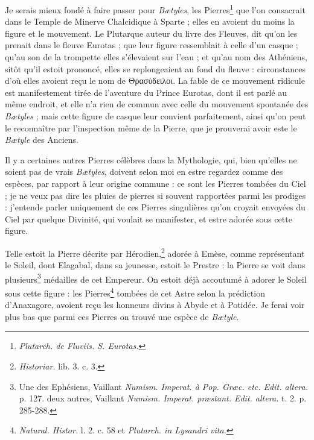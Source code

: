 \documentclass[a4paper, 11pt, oneside, polutonikogreek, french, landscape]{article}
\begin{document}
Je serais mieux fondé à faire passer pour \emph{Bætyles}, les Pierres\footnote{\emph{Plutarch. de Fluviis. S. Eurotas.}} que l'on consacrait dans le Temple de Minerve Chalcidique à Sparte ; elles en avoient du moins la figure et le mouvement. Le Plutarque auteur du livre des Fleuves, dit qu'on les prenait dans le fleuve Eurotas ; que leur figure ressemblait à celle d'un casque ; qu'au son de la trompette elles s'élevaient sur l'eau ; et qu'au nom des Athéniens, sitôt qu'il estoit prononcé, elles se replongeaient au fond du fleuve : circonstances d'où elles avoient reçu le nom de Θρασύδειλοι. La fable de ce mouvement ridicule est manifestement tirée de l'aventure du Prince Eurotas, dont il est parlé au même endroit, et elle n'a rien de commun avec celle du mouvement spontanée des \emph{Bætyles} ; mais cette figure de casque leur convient parfaitement, ainsi qu'on peut le reconnaître par l'inspection même de la Pierre, que je prouverai avoir este le \emph{Bætyle} des Anciens.

Il y a certaines autres Pierres célèbres dans la Mythologie, qui, bien qu'elles ne soient pas de vrais \emph{Bætyles}, doivent selon moi en estre regardez comme des espèces, par rapport à leur origine commune : ce sont les Pierres tombées du Ciel ; je ne veux pas dire les pluies de pierres si souvent rapportées parmi les prodiges : j'entends parler uniquement de ces Pierres singulières qu'on croyait envoyées du Ciel par quelque Divinité, qui voulait se manifester, et estre adorée sous cette figure.

Telle estoit la Pierre décrite par Hérodien,\footnote{\emph{Historiar.} lib. 3. c. 3.} adorée à Emèse, comme représentant le Soleil, dont Elagabal, dans sa jeunesse, estoit le Prestre : la Pierre se voit dans plusieurs\footnote{Une des Ephésiens, Vaillant \emph{Numism. Imperat. à Pop. Græc. etc. Edit. altera.} p. 127. deux autres, Vaillant \emph{Numism. Imperat. præstant. Edit. altera.} t. 2. p. 285-288.} médailles de cet Empereur. On estoit déjà accoutumé à adorer le Soleil sous cette figure : les Pierres\footnote{\emph{Natural. Histor.} l. 2. c. 58 et \emph{Plutarch. in Lysandri vita.}} tombées de cet Astre selon la prédiction d'Anaxagore, avoient reçu les honneurs divins à Abyde et à Potidée. Je ferai voir plus bas que parmi ces Pierres on trouvé une espèce de \emph{Bætyle}.
\end{document}
